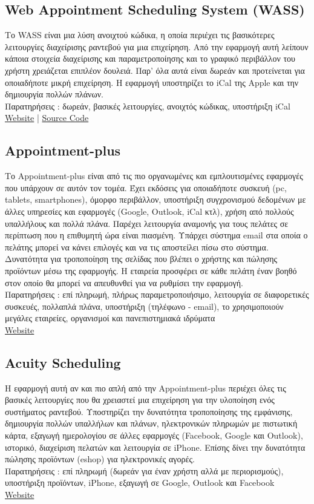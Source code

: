 \documentclass[12pt]{article}
\begin{document}
\subsection{Web Appointment Scheduling System (WASS)}
Το WASS είναι μια λύση ανοιχτού κώδικα, η οποία περιέχει τις βασικότερες λειτουργίες διαχείρισης ραντεβού για μια επιχείρηση. Από την εφαρμογή αυτή λείπουν κάποια στοιχεία διαχείρισης και παραμετροποίησης και το γραφικό περιβάλλον του χρήστη χρειάζεται επιπλέον δουλειά. Παρ' όλα αυτά είναι δωρεάν και προτείνεται για οποιαδήποτε μικρή επιχείρηση. Η εφαρμογή υποστηρίζει το iCal της Apple και την δημιουργία πολλών πλάνων.
\\[0.3cm]
Παρατηρήσεις : δωρεάν, βασικές λειτουργίες, ανοιχτός κώδικας, υποστήριξη iCal
\\[0.3cm]
\href{https://wass.princeton.edu/pages/login.page.php}{Website} |
\href{http://sourceforge.net/projects/wass/}{Source Code}

\subsection{Appointment-plus}
Το Appointment-plus είναι από τις πιο οργανωμένες και εμπλουτισμένες εφαρμογές που υπάρχουν σε αυτόν τον τομέα. Έχει εκδόσεις για οποιαδήποτε συσκευή (pc, tablets, smartphones), όμορφο περιβάλλον, υποστήριξη συγχρονισμού δεδομένων με άλλες υπηρεσίες και εφαρμογές (Google, Outlook, iCal κτλ), χρήση από πολλούς υπαλλήλους και πολλά πλάνα. Παρέχει λειτουργία αναμονής για τους πελάτες σε περίπτωση που η επιθυμητή ώρα είναι πιασμένη. Υπάρχει σύστημα email στα οποία ο πελάτης μπορεί να κάνει επιλογές και να τις αποστείλει πίσω στο σύστημα. Δυνατότητα για τροποποίηση της σελίδας που βλέπει ο χρήστης και πώλησης προϊόντων μέσω της εφαρμογής. Η εταιρεία προσφέρει σε κάθε πελάτη έναν βοηθό στον οποίο θα μπορεί να απευθυνθεί για να ρυθμίσει την εφαρμογή. 
\\[0.3cm]
Παρατηρήσεις : επί πληρωμή, πλήρως παραμετροποιήσιμο, λειτουργία σε διαφορετικές συσκευές, πολλαπλά πλάνα, υποστήριξη (τηλέφωνο - email), το χρησιμοποιούν μεγάλες εταιρείες, οργανισμοί και πανεπιστημιακά ιδρύματα
\\[0.3cm]
\href{http://www.appointment-plus.com/}{Website}

\subsection{Acuity Scheduling}
Η εφαρμογή αυτή αν και πιο απλή από την Appointment-plus περιέχει όλες τις βασικές λειτουργίες που θα χρειαστεί μια επιχείρηση για την υλοποίηση ενός συστήματος ραντεβού. Υποστηρίζει την δυνατότητα τροποποίησης της εμφάνισης, δημιουργία πολλών υπαλλήλων και πλάνων, ηλεκτρονικών πληρωμών με πιστωτική κάρτα, εξαγωγή ημερολογίου σε άλλες εφαρμογές (Facebook, Google και Outlook), ιστορικό, διαχείριση πελατών και λειτουργία σε iPhone. Επίσης δίνει την δυνατότητα πώλησης προϊόντων (eshop) για ηλεκτρονικές αγορές.
\\[0.3cm]
Παρατηρήσεις : επί πληρωμή (δωρεάν για έναν χρήστη αλλά με περιορισμούς), υποστήριξη προϊόντων, iPhone, εξαγωγή σε Google, Outlook και Facebook
\\[0.3cm]
\href{http://www.acuityscheduling.com/}{Website}
\end{document}
